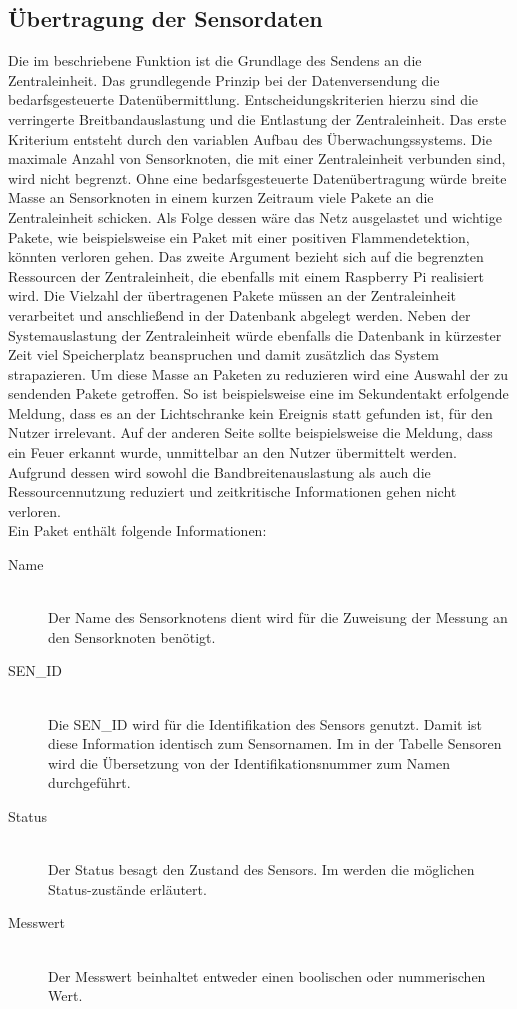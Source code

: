 \subsection{Übertragung der Sensordaten}\label{Sensorknoten:JSON}
Die im  beschriebene Funktion ist die Grundlage des Sendens an die Zentraleinheit. Das grundlegende Prinzip bei der Datenversendung die bedarfsgesteuerte Datenübermittlung. Entscheidungskriterien hierzu sind die verringerte Breitbandauslastung und die Entlastung der Zentraleinheit. Das erste Kriterium entsteht durch den variablen Aufbau des Überwachungssystems. Die maximale Anzahl von Sensorknoten, die mit einer Zentraleinheit verbunden sind, wird nicht begrenzt. Ohne eine bedarfsgesteuerte Datenübertragung würde breite Masse an Sensorknoten in einem kurzen Zeitraum viele Pakete an die Zentraleinheit schicken. Als Folge dessen wäre das Netz ausgelastet und wichtige Pakete, wie beispielsweise ein Paket mit einer positiven Flammendetektion, könnten verloren gehen. Das zweite Argument bezieht sich auf die begrenzten Ressourcen der Zentraleinheit, die ebenfalls mit einem Raspberry Pi realisiert wird. Die Vielzahl der übertragenen Pakete müssen an der Zentraleinheit verarbeitet und anschließend in der Datenbank abgelegt werden. Neben der Systemauslastung der Zentraleinheit würde ebenfalls die Datenbank in kürzester Zeit viel Speicherplatz beanspruchen und damit zusätzlich das System strapazieren. Um diese Masse an Paketen zu reduzieren wird eine Auswahl der zu sendenden Pakete getroffen. So ist beispielsweise eine im Sekundentakt erfolgende Meldung, dass es an der Lichtschranke kein Ereignis statt gefunden ist, für den Nutzer irrelevant. Auf der anderen Seite sollte beispielsweise die Meldung, dass ein Feuer erkannt wurde, unmittelbar an den Nutzer übermittelt werden. Aufgrund dessen wird sowohl die Bandbreitenauslastung als auch die Ressourcennutzung reduziert und zeitkritische Informationen gehen nicht verloren.\\
Ein Paket enthält folgende Informationen:
\begin{description}
	\item[Name] \hfill \\
		Der Name des Sensorknotens dient wird für die Zuweisung der Messung an den Sensorknoten benötigt.
	\item[SEN\_ID] \hfill \\
		Die SEN\_ID wird für die Identifikation des Sensors genutzt. Damit ist diese Information identisch zum Sensornamen. Im  in der Tabelle Sensoren wird die Übersetzung von der Identifikationsnummer zum Namen durchgeführt.
	\item[Status] \hfill \\
		Der Status besagt den Zustand des Sensors. Im  werden die möglichen Status-zustände erläutert.
	\item[Messwert] \hfill \\
		Der Messwert beinhaltet entweder einen boolischen oder nummerischen Wert.
\end{description} 
